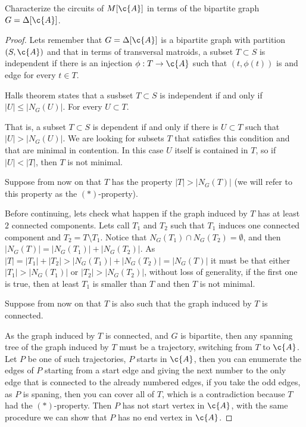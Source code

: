 \prob
{
    Characterize the circuits of $M[\c{A}]$ in terms of the bipartite graph $G = \Delta[\c{A}]$.
}
\begin{proof}
    Lets remember that $G = \Delta[\c{A}]$ is a bipartite graph with partition $(S, \c{A})$ and that
    in terms of transversal matroids, a subset $T \subset S$ is independent if there is an injection
    $\phi : T \rightarrow \c{A}$ such that $(t, \phi(t))$ is and edge for every $t \in T$.\pn
    
    Halls theorem states that a susbset $T \subset S$ is independent if and only if $|U| \leq |N_G(U)|$.
    For every $U \subset T$.\pn
    
    That is, a subset $T \subset S$ is dependent if and only if there is $U \subset T$ such that $|U| > |N_G(U)|$. 
    We are looking for subsets $T$ that satisfies this condition and that are minimal in contention. In this case
    $U$ itself is contained in $T$, so if $|U| < |T|$, then $T$ is not minimal.\pn
    
    Suppose from now on that $T$ has the property $|T| > |N_G(T)|$ (we will refer to this property as the
    $(*)$-property).\pn
    
    Before continuing, lets check what happen if the graph induced by $T$ has at least $2$ connected components.
    Lets call $T_1$ and $T_2$ such that $T_1$ induces one connected component and $T_2 = T \setminus T_1$.
    Notice that $N_G(T_1) \cap N_G(T_2) = \emptyset$, and then $|N_G(T)| = |N_G(T_1)| + |N_G(T_2)|$. 
    As $|T| = |T_1| + |T_2| > |N_G(T_1) | + |N_G(T_2)| = |N_G(T)|$ 
    it must be that either $|T_1| > |N_G(T_1)|$ or $|T_2| > |N_G(T_2)|$, without loss of generality, 
    if the first one is true, then at least $T_1$ is smaller than $T$ and then $T$ is not minimal.\pn
        
    Suppose from now on that $T$ is also such that the graph induced by $T$ is connected.\pn
    
    As the graph induced by $T$ is connected, and $G$ is bipartite, then any spanning tree of the graph induced by $T$ must
    be a trajectory, switching from $T$ to $\c{A}$. Let $P$ be one of such trajectories, $P$ starts in $\c{A}$, then you can 
    enumerate the edges of $P$ starting from a start edge and giving the next number to the only edge that is connected to the already numbered
    edges, if you take the odd edges, as $P$ is spaning, then you can cover all of $T$, which is a contradiction because $T$ had
    the $(*)$-property. Then $P$ has not start vertex in $\c{A}$, with the same procedure we can show that $P$ has no end vertex in $\c{A}$.\pn
    

\end{proof}
